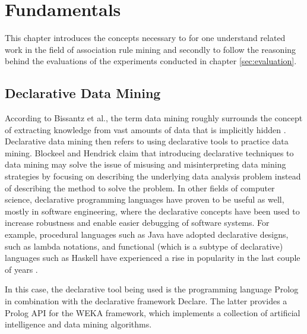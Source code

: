\documentclass[bachelor,english]{info1thesis}
\begin{document}







\chapter{Fundamentals}
\label{sec:fundamentals}
This chapter introduces the concepts necessary to for one understand related work in the field of association rule mining and secondly to follow the reasoning behind the evaluations of the experiments conducted in chapter \ref{sec:evaluation}. 

\section{Declarative Data Mining}
\label{sec:datamining}
According to Bissantz et al., the term data mining roughly surrounds the concept of extracting knowledge from vast amounts of data that is implicitly hidden \cite{bissantz2009data}. Declarative data mining then refers to using declarative tools to practice data mining. Blockeel and Hendrick claim that introducing declarative techniques to data mining may solve the issue of misusing and misinterpreting data mining strategies by focusing on describing the underlying data analysis problem instead of describing the method to solve the problem. In other fields of computer science, declarative programming languages have proven to be useful as well, mostly in software engineering, where the declarative concepts have been used to increase robustness and enable easier debugging of software systems. For example, procedural languages such as Java have adopted declarative designs, such as lambda notations, and functional (which is a subtype of declarative) languages such as Haskell have experienced a rise in popularity in the last couple of years \cite{blockeel2015data}.

In this case, the declarative tool being used is the programming language Prolog in combination with the declarative framework Declare. The latter provides a Prolog API for the WEKA framework, which implements a collection of artificial intelligence and data mining algorithms. \newline
\end{document}
